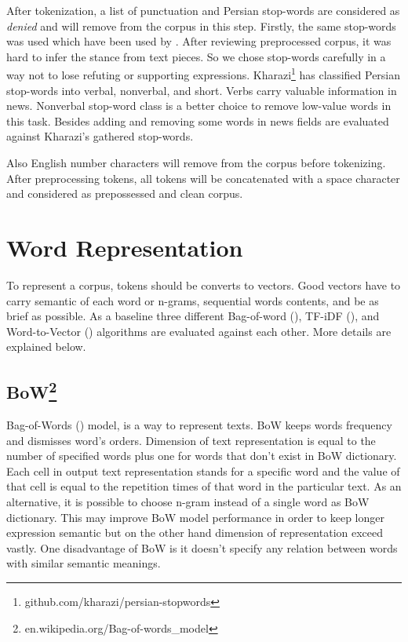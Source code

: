 After tokenization, a list of punctuation and Persian stop-words are considered as \textit{denied} and will remove from the corpus in this step. Firstly, the same stop-words was used which have been used by \cite{stance_persian}. After reviewing preprocessed corpus, it was hard to infer the stance from text pieces. So we chose stop-words carefully in a way not to lose refuting or supporting expressions. Kharazi\footnote{\label{fn:kharazi}github.com/kharazi/persian-stopwords} has classified Persian stop-words into verbal, nonverbal, and short. Verbs carry valuable information in news. Nonverbal stop-word class is a better choice to remove low-value words in this task. Besides adding and removing some words in news fields are evaluated against Kharazi's gathered stop-words. 

Also English number characters will remove from the corpus before tokenizing. After preprocessing tokens, all tokens will be concatenated with a space character and considered as prepossessed and clean corpus.


\section{Word Representation}
To represent a corpus, tokens should be converts to vectors. Good vectors have to carry semantic of each word or n-grams, sequential words contents, and be as brief as possible. As a baseline three different Bag-of-word (\cite{bow}), TF-iDF (\cite{tfidf}), and Word-to-Vector (\cite{word2vec}) algorithms are evaluated against each other. More details are explained below.

\subsection{BoW\protect\footnote{en.wikipedia.org/Bag-of-words\_model}}
Bag-of-Words (\cite{bow}) model, is a way to represent texts. BoW keeps words frequency and
dismisses word's orders. Dimension of text representation is equal to the number of specified words plus one for words that don't exist in BoW dictionary. Each cell in output text representation stands for a specific word and the value of that cell is equal to the repetition times of that word in the particular text. As an alternative, it is possible to choose n-gram instead of a single word as BoW dictionary. This may improve BoW model performance in order to keep longer expression semantic but on the other hand dimension of representation exceed vastly. One disadvantage of BoW is it doesn't specify any relation between words with similar semantic meanings. 

